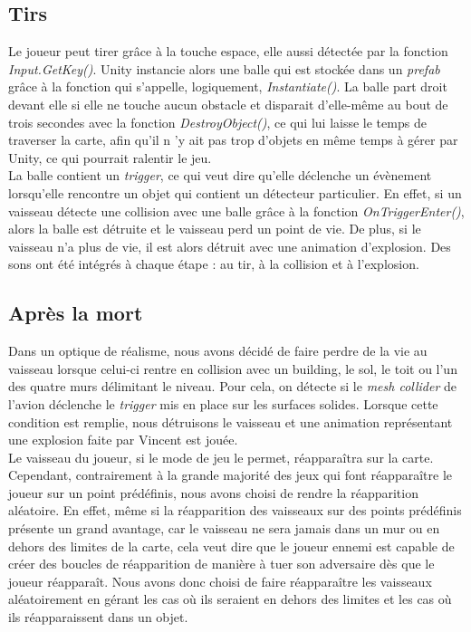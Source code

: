 \documentclass[12pt, titlepage]{article}
\begin{document}
\begin{spacing}{1.5}
\newpage
\subsection{Tirs}

Le joueur peut tirer grâce à la touche espace, elle aussi détectée par la fonction \textit{Input.GetKey()}. Unity instancie alors une balle qui est stockée dans un \textit{prefab} grâce à la fonction qui s'appelle, logiquement, \textit{Instantiate()}. La balle part droit devant elle si elle ne touche aucun obstacle et disparait d'elle-même au bout de trois secondes avec la fonction \textit{DestroyObject()}, ce qui lui laisse le temps de traverser la carte, afin qu'il n 'y ait pas trop d'objets en même temps à gérer par Unity, ce qui pourrait ralentir le jeu.\\

La balle contient un \textit{trigger}, ce qui veut dire qu'elle déclenche un évènement lorsqu'elle rencontre un objet qui contient un détecteur particulier. En effet, si un vaisseau détecte une collision avec une balle grâce à la fonction \textit{OnTriggerEnter()}, alors la balle est détruite et le vaisseau perd un point de vie. De plus, si le vaisseau n'a plus de vie, il est alors détruit avec une animation d'explosion. Des sons ont été intégrés à chaque étape : au tir, à la collision et à l'explosion.\\

\newpage
\subsection{Après la mort}

Dans un optique de réalisme, nous avons décidé de faire perdre de la vie au vaisseau lorsque celui-ci rentre en collision avec un building, le sol, le toit ou l'un des quatre murs délimitant le niveau. Pour cela, on détecte si le \textit{mesh collider} de l'avion déclenche le \textit{trigger} mis en place sur les surfaces solides. Lorsque cette condition est remplie, nous détruisons le vaisseau et une animation représentant une explosion faite par Vincent est jouée.\\
 
Le vaisseau du joueur, si le mode de jeu le permet, réapparaîtra sur la carte. Cependant, contrairement à la grande majorité des jeux qui font réapparaître le joueur sur un point prédéfinis, nous avons choisi de rendre la réapparition aléatoire. En effet, même si la réapparition des vaisseaux sur des points prédéfinis présente un grand avantage, car le vaisseau ne sera jamais dans un mur ou en dehors des limites de la carte, cela veut dire que le joueur ennemi est capable de créer des boucles de réapparition de manière à tuer son adversaire dès que le joueur réapparaît. Nous avons donc choisi de faire réapparaître les vaisseaux aléatoirement en gérant les cas où ils seraient en dehors des limites et les cas où ils réapparaissent dans un objet.\\
 

\end{spacing}
\end{document}

